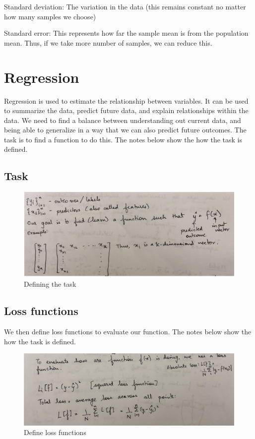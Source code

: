 Standard deviation: The variation in the data (this remains constant no matter how many samples we choose)\newline

Standard error: This represents how far the sample mean is from the population mean. Thus, if we take more number of samples, we can reduce this. 

\section{Regression}
Regression is used to estimate the relationship between variables. It can be used to summarize the data, predict future data, and explain relationships within the data. We need to find a balance between understanding out current data, and being able to generalize in a way that we can also predict future outcomes. The task is to find a function to do this.
The notes below show the how the task is defined.
\subsection{Task}
\begin{figure}[!ht]
  \begin{center}
    \includegraphics[scale=0.8]{figures/1.png}
    \caption{Defining the task }
    \label{fig:1}
  \end{center}
\end{figure}
\subsection{Loss functions}
We then define loss functions to evaluate our function.
The notes below show the how the task is defined.
\begin{figure}[!ht]
  \begin{center}
    \includegraphics[scale=0.8]{figures/2.png}
    \caption{Define loss functions }
    \label{fig:2}
  \end{center}
\end{figure}
\newpage
